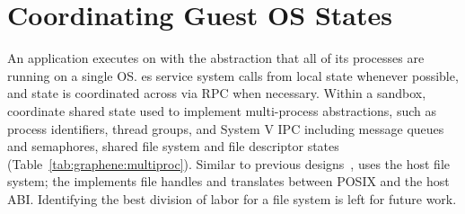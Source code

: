 \section{Coordinating Guest OS States}
\label{sec:graphene:namespaces}



An application executes on \graphene{} 
with the abstraction that all of its processes are running on a single OS.
\graphene{} \libos{}es service system calls
from local \libos{} state whenever possible,
and state is coordinated across \picoprocs{} via RPC when necessary.
Within a sandbox, \graphene{} \picoprocs{} 
coordinate shared state used to implement multi-process
abstractions, such as process identifiers, thread groups, and 
System V IPC including message queues and semaphores, shared file system and file descriptor states (Table~\ref{tab:graphene:multiproc}).
Similar to previous designs~\cite{porter11drawbridge,baumann13bascule}, 
\graphene{} uses the host file system; 
the \libos{} implements file handles and translates between POSIX and the host ABI.
Identifying the best division of labor for a \libos{} file system is 
left for future work.

